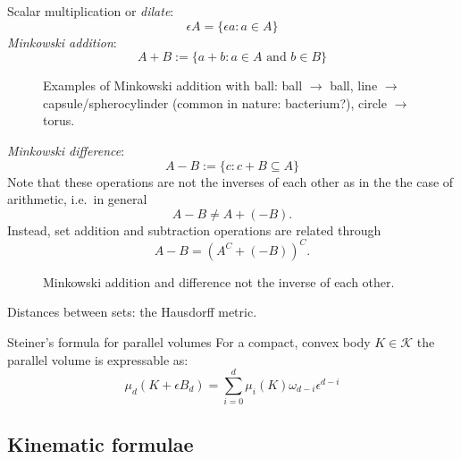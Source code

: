 Scalar multiplication or \emph{dilate}:
\begin{equation}
  \epsilon A = \{\epsilon a : a \in A\}
\end{equation}
\emph{Minkowski addition}:
\begin{equation}
  A + B := \{ a + b : a \in A \textrm{ and } b \in B \}
\end{equation}
\begin{SCfigure}[H]
  \missingfigure[figwidth=0.333\linewidth]{}%
  \missingfigure[figwidth=0.333\linewidth]{}%
  \missingfigure[figwidth=0.333\linewidth]{}
  \caption{Examples of Minkowski addition with ball:
    ball $\to$ ball,
    line $\to$ capsule/spherocylinder (common in nature: bacterium?),
    circle $\to$ torus.
  }
\end{SCfigure}
\emph{Minkowski difference}:
\begin{equation}
  A - B := \{ c : c + B \subseteq A \}
\end{equation}
Note that these operations are not the inverses of each other as in the the case of arithmetic, i.e.\ in general
\begin{equation*}
  A - B \ne A + (-B).
\end{equation*}
Instead, set addition and subtraction operations are related through
\begin{equation*}
  A - B = (A^C + (-B))^C.
\end{equation*}

\begin{SCfigure}[H]
  \caption{Minkowski addition and difference not the inverse of each other.}
\end{SCfigure}

Distances between sets: the Hausdorff metric.

\begin{theorem}{Steiner's formula for parallel volumes}
  For a compact, convex body $K \in \mathcal{K}$ the parallel volume is expressable as:
  \begin{equation}
    \mu_d(K + \epsilon B_d) =
    \sum_{i=0}^d \mu_i(K) \omega_{d-i} \epsilon^{d-i}
  \end{equation}
\end{theorem}

\subsection{Kinematic formulae}

